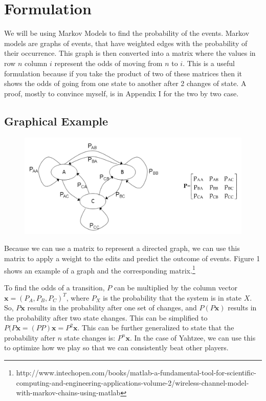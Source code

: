 \usepackage[utf8]{inputenc, graphixc, caption, fullpage}

\section{Formulation}

We will be using Markov Models to find the probability of the events.
Markov models are graphs of events, that have weighted edges with the probability of their occurrence.
This graph is then converted into a matrix where the values in row $n$ column $i$ represent the odds of moving from $n$ to $i$.
This is a useful formulation because if you take the product of two of these matrices then it shows the odds of going from one state to another after 2 changes of state.
A proof, mostly to convince myself, is in Appendix I for the two by two case.

\subsection{Graphical Example}

\begin{figure}
  \includegraphics[width=\linewidth]{image11.jpeg}
  \label{Figure 1: Probability transition diagram for a 3-state Markov chain}
\end{figure}

Because we can use a matrix to represent a directed graph, we can use this matrix
to apply a weight to the edits and predict the outcome of events. Figure 1
shows an example of a graph and the corresponding matrix.\footnote{http://www.intechopen.com/books/matlab-a-fundamental-tool-for-scientific-computing-and-engineering-applications-volume-2/wireless-channel-model-with-markov-chains-using-matlab}

To find the odds of a transition, $P$ can be multiplied by the column vector
$\mathbf{x}=({P_A, P_B, P_C})^T$, where $P_X$ is the probability that the system
is in state $X$. So, $P\mathbf{x}$ results in the probability after one set
of changes, and $P(P\mathbf{x})$ results in the probability after two state
changes. This can be simplified to $P(P\mathbf{x} = (PP)\mathbf{x} = P^2\mathbf{x}$.
This can be further generalized to state that the probability after $n$ state
changes is: $P^n\mathbf{x}$. In the case of Yahtzee, we can use this to optimize
how we play so that we can consistently beat other players.

